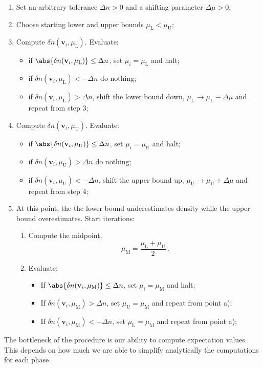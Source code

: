 \begin{enumerate}
	\item Set an arbitrary tolerance $\Delta n > 0$ and a shifting parameter $\Delta \mu > 0$;
	\item Choose starting lower and upper bounds $\mu_\mathrm{L}<\mu_\mathrm{U}$;
	\item Compute $\delta n(\mathbf{v}_i,\mu_\mathrm{L})$. Evaluate: 
	\begin{itemize}
		\item if $\abs{\delta n(\mathbf{v}_i,\mu_\mathrm{L})} \le \Delta n$, set $\mu_i = \mu_\mathrm{L}$ and halt;
		\item if $\delta n(\mathbf{v}_i,\mu_\mathrm{L}) < -\Delta n$ do nothing;
		\item if $\delta n(\mathbf{v}_i,\mu_\mathrm{L}) > \Delta n$, shift the lower bound down, $\mu_\mathrm{L} \to \mu_\mathrm{L} - \Delta \mu$ and repeat from step 3;
	\end{itemize}
	\item Compute $\delta n(\mathbf{v}_i,\mu_\mathrm{U})$. Evaluate: 
	\begin{itemize}
		\item if $\abs{\delta n(\mathbf{v}_i,\mu_\mathrm{U})} \le \Delta n$, set $\mu_i = \mu_\mathrm{U}$ and halt;
		\item if $\delta n(\mathbf{v}_i,\mu_\mathrm{U}) > \Delta n$ do nothing;
		\item if $\delta n(\mathbf{v}_i,\mu_\mathrm{U}) < - \Delta n$, shift the upper bound up, $\mu_\mathrm{U} \to \mu_\mathrm{U} + \Delta \mu$ and repeat from step 4;
	\end{itemize}
	\item At this point, the the lower bound underestimates density while the upper bound overestimates. Start iterations:
	\begin{enumerate}
		\item Compute the midpoint,
		\[
			\mu_\mathrm{M} = \frac{\mu_\mathrm{L} + \mu_\mathrm{U}}{2} \, .
		\]
		\item Evaluate:
		\begin{itemize}
			\item If $\abs{\delta n(\mathbf{v}_i,\mu_\mathrm{M})} \le \Delta n$, set $\mu_i = \mu_\mathrm{M}$ and halt;
			\item If $\delta n(\mathbf{v}_i,\mu_\mathrm{M}) > \Delta n$, set $\mu_\mathrm{U} = \mu_\mathrm{M}$ and repeat from point a);
			\item If $\delta n(\mathbf{v}_i,\mu_\mathrm{M}) < -\Delta n$, set $\mu_\mathrm{L} = \mu_\mathrm{M}$ and repeat from point a);
		\end{itemize}
	\end{enumerate}
\end{enumerate}
The bottleneck of the procedure is our ability to compute expectation values. This depends on how much we are able to simplify analytically the computations for each phase.


